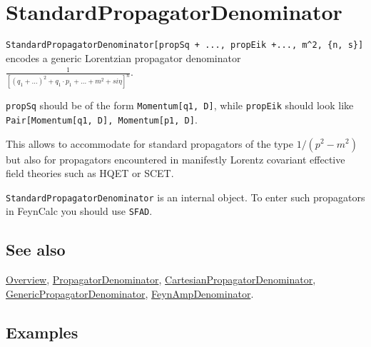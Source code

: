 \documentclass[../FeynCalcManual.tex]{subfiles}
\begin{document}
\hypertarget{standardpropagatordenominator}{
\section{StandardPropagatorDenominator}\label{standardpropagatordenominator}}

\texttt{StandardPropagatorDenominator[\allowbreak{}propSq + ...,\ \allowbreak{}propEik +...,\ \allowbreak{}m^2,\ \allowbreak{}\{\allowbreak{}n,\ \allowbreak{}s\}]}
encodes a generic Lorentzian propagator denominator
\(\frac{1}{[(q_1+ \ldots)^2 + q_1 \cdot p_1 + \ldots + m^2 + s i \eta]^n}\).

\texttt{propSq} should be of the form
\texttt{Momentum[\allowbreak{}q1,\ \allowbreak{}D]}, while
\texttt{propEik} should look like
\texttt{Pair[\allowbreak{}Momentum[\allowbreak{}q1,\ \allowbreak{}D],\ \allowbreak{}Momentum[\allowbreak{}p1,\ \allowbreak{}D]}.

This allows to accommodate for standard propagators of the type
\(1/(p^2-m^2)\) but also for propagators encountered in manifestly
Lorentz covariant effective field theories such as HQET or SCET.

\texttt{StandardPropagatorDenominator} is an internal object. To enter
such propagators in FeynCalc you should use \texttt{SFAD}.

\subsection{See also}

\hyperlink{toc}{Overview},
\hyperlink{propagatordenominator}{PropagatorDenominator},
\hyperlink{cartesianpropagatordenominator}{CartesianPropagatorDenominator},
\hyperlink{genericpropagatordenominator}{GenericPropagatorDenominator},
\hyperlink{feynampdenominator}{FeynAmpDenominator}.

\subsection{Examples}

\begin{Shaded}
\begin{Highlighting}[]
\OperatorTok{[}\OperatorTok{[}\OperatorTok{[}\OperatorTok{,} \OperatorTok{],} \OperatorTok{,} \SpecialCharTok{{-}}\SpecialCharTok{\^{}}\OperatorTok{,} \OperatorTok{\{}\OperatorTok{,} \OperatorTok{\}]]}
\end{Highlighting}
\end{Shaded}
\end{document}
